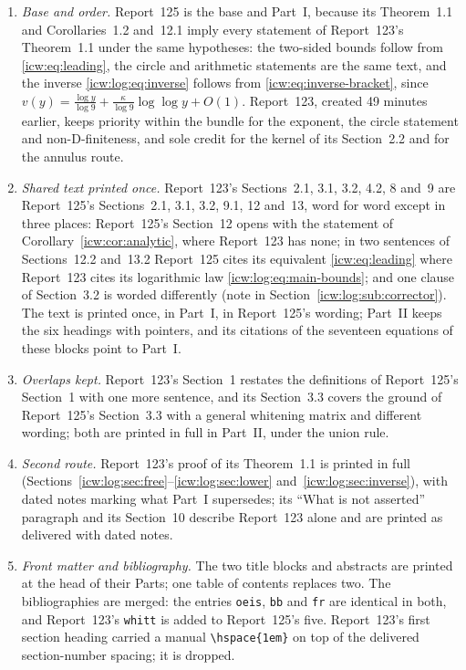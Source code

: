 \documentclass[11pt,letterpaper]{article}
\theoremstyle{remark}\newtheorem{remark}[theorem]{Remark}
\newcommand{\1}{\mathbf1}
\begin{document}
\begin{enumerate}
\item \emph{Base and order.} Report~125 is the base and Part~I, because its Theorem~1.1 and Corollaries~1.2 and~12.1 imply every statement of Report~123's Theorem~1.1 under the same hypotheses: the two-sided bounds follow from \eqref{icw:eq:leading}, the circle and arithmetic statements are the same text, and the inverse \eqref{icw:log:eq:inverse} follows from \eqref{icw:eq:inverse-bracket}, since $v(y)=\frac{\log y}{\log9}+\frac\kappa{\log9}\log\log y+O(1)$. Report~123, created 49 minutes earlier, keeps priority within the bundle for the exponent, the circle statement and non-D-finiteness, and sole credit for the kernel of its Section~2.2 and for the annulus route.
\item \emph{Shared text printed once.} Report~123's Sections~2.1, 3.1, 3.2, 4.2, 8 and~9 are Report~125's Sections~2.1, 3.1, 3.2, 9.1, 12 and~13, word for word except in three places: Report~125's Section~12 opens with the statement of Corollary~\ref{icw:cor:analytic}, where Report~123 has none; in two sentences of Sections~12.2 and~13.2 Report~125 cites its equivalent \eqref{icw:eq:leading} where Report~123 cites its logarithmic law \eqref{icw:log:eq:main-bounds}; and one clause of Section~3.2 is worded differently (note in Section~\ref{icw:log:sub:corrector}). The text is printed once, in Part~I, in Report~125's wording; Part~II keeps the six headings with pointers, and its citations of the seventeen equations of these blocks point to Part~I.
\item \emph{Overlaps kept.} Report~123's Section~1 restates the definitions of Report~125's Section~1 with one more sentence, and its Section~3.3 covers the ground of Report~125's Section~3.3 with a general whitening matrix and different wording; both are printed in full in Part~II, under the union rule.
\item \emph{Second route.} Report~123's proof of its Theorem~1.1 is printed in full (Sections~\ref{icw:log:sec:free}--\ref{icw:log:sec:lower} and~\ref{icw:log:sec:inverse}), with dated notes marking what Part~I supersedes; its ``What is not asserted'' paragraph and its Section~10 describe Report~123 alone and are printed as delivered with dated notes.
\item \emph{Front matter and bibliography.} The two title blocks and abstracts are printed at the head of their Parts; one table of contents replaces two. The bibliographies are merged: the entries \texttt{oeis}, \texttt{bb} and \texttt{fr} are identical in both, and Report~123's \texttt{whitt} is added to Report~125's five. Report~123's first section heading carried a manual \verb|\hspace{1em}| on top of the delivered section-number spacing; it is dropped.

\end{enumerate}
\end{document}

